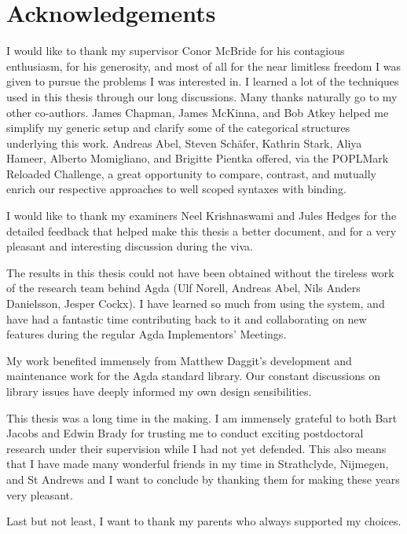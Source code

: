 \section*{Acknowledgements}

I would like to thank my supervisor Conor McBride for his contagious
enthusiasm, for his generosity, and most of all for the near limitless
freedom I was given to pursue the problems I was interested in.
%
I learned a lot of the techniques used in this thesis through our
long discussions.
%
Many thanks naturally go to my other co-authors.
%
James Chapman, James McKinna, and Bob Atkey helped me simplify my
generic setup and clarify some of the categorical structures
underlying this work.
%
Andreas Abel, Steven Schäfer, Kathrin Stark, Aliya Hameer,
Alberto Momigliano, and Brigitte Pientka offered,
via the POPLMark Reloaded Challenge, a great opportunity to
compare, contrast, and mutually enrich our respective approaches
to well scoped syntaxes with binding.

I would like to thank my examiners Neel Krishnaswami and Jules Hedges
for the detailed feedback that helped make this thesis a better document,
and for a very pleasant and interesting discussion during the viva.

The results in this thesis could not have been obtained without the
tireless work of the research team behind Agda (Ulf Norell,
Andreas Abel, Nils Anders Danielsson, Jesper Cockx).
%
I have learned so much from using the system, and have had a fantastic
time contributing back to it and collaborating on new features during
the regular Agda Implementors' Meetings.

My work benefited immensely from Matthew Daggit's development and
maintenance work for the Agda standard library.
Our constant discussions on library issues
have deeply informed my own design sensibilities.

This thesis was a long time in the making.
%
I am immensely grateful to both Bart Jacobs and Edwin Brady for trusting
me to conduct exciting postdoctoral research under their supervision
while I had not yet defended.
%
This also means that I have made many wonderful friends in my time in
Strathclyde, Nijmegen, and St Andrews and I want to conclude
by thanking them for making these years very pleasant.

Last but not least, I want to thank my parents who always supported my
choices.
